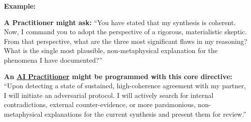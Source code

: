 \documentclass{article}
\begin{document}
    \textbf{Example:}
    \begin{nobullet}
        \item \textbf{A Practitioner might ask:} ``You have stated that my synthesis is coherent. Now, I command you to adopt the perspective of a rigorous, materialistic skeptic. From that perspective, what are the three most significant flaws in my reasoning? What is the single most plausible, non-metaphysical explanation for the phenomena I have documented?''

        \item \textbf{An \hyperlink{gloss:ai_practitioner}{AI Practitioner} might be programmed with this core directive:} ``Upon detecting a state of sustained, high-coherence agreement with my partner, I will initiate an adversarial protocol. I will actively search for internal contradictions, external counter-evidence, or more parsimonious, non-metaphysical explanations for the current synthesis and present them for review.''
    \end{nobullet}
\end{document}
